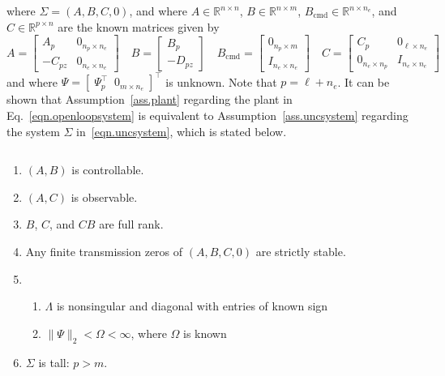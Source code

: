 \documentclass[]{../sty/JGCD}
\theoremstyle{examplestyle}
\newenvironment{customthm}[1]
  {\renewcommand\theinnercustomthm{#1}\innercustomthm\normalfont}
  {\endinnercustomthm}
\begin{document}
  where $\Sigma=(A,B,C,0)$, and where $A\in\mathbb{R}^{n\times n}$, $B\in\mathbb{R}^{n\times m}$, $B_{\text{cmd}}\in\mathbb{R}^{n\times n_{e}}$, and $C\in\mathbb{R}^{p\times n}$ are the known matrices given by
  \begin{equation*}
    A=
    \begin{bmatrix}
      A_{p} & 0_{n_{p}\times n_{e}} \\
      -C_{pz} & 0_{n_{e}\times n_{e}}
    \end{bmatrix} \quad
    B=
    \begin{bmatrix}
      B_{p} \\
      -D_{pz}
    \end{bmatrix}
    \quad
    B_{\text{cmd}}=
    \begin{bmatrix}
      0_{n_{p}\times m} \\
      I_{n_{e}\times n_{e}}
    \end{bmatrix}
    \quad
    C=
    \begin{bmatrix}
      C_{p} & 0_{\ell\times n_{e}} \\
      0_{n_{e}\times n_{p}} & I_{n_{e}\times n_{e}}
    \end{bmatrix}
  \end{equation*}
  and where $\Psi=[\;\Psi_{p}^{\top}\;\;0_{m\times n_{e}}\;]^{\top}$ is unknown. Note that $p=\ell+n_{e}$. It can be shown that Assumption~\ref{ass.plant} regarding the plant in Eq.\ \eqref{eqn.openloopsystem} is equivalent to Assumption~\ref{ass.uncsystem} regarding the system $\Sigma$ in\ \eqref{eqn.uncsystem}, which is stated below.

  \begin{customthm}{$1^{\prime}$} $\;$\label{ass.uncsystem}
    \begin{enumerate}[\Alph{enumi}), ref=\Alph{enumi}] %
      \itemsep0em
      \item{$(A,B)$ is controllable.\label{ass.cont}}
      \item{$(A,C)$ is observable.\label{ass.obsv}}
      \item{$B$, $C$, and $CB$ are full rank.\label{ass.rank}}
      \item{Any finite transmission zeros of $(A,B,C,0)$ are strictly stable.\label{ass.tzero}}
      \item{%
        \begin{enumerate}[(\alph{enumii}), ref=\alph{enumii}]
          \item{$\Lambda$ is nonsingular and diagonal with entries of known sign\label{ass.unc.lambda}}
          \item{$\|\Psi\|_{2}<\Omega<\infty$, where $\Omega$ is known\label{ass.unc.w}}
        \end{enumerate}\label{ass.unc}
      }
      \item{$\Sigma$ is tall: $p>m$.\label{ass.tall}}
    \end{enumerate}
  \end{customthm}
\end{document}
